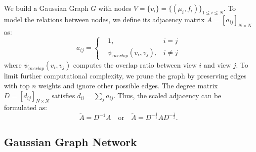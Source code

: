We build a Gaussian Graph $G$ with nodes $V=\{v_{i}\}=\{(\mu_{i},f_{i})\}_{1\leq i\leq N}$. 
To model the relations between nodes, we define its adjacency matrix $A=[a_{ij}]_{N\times N}$ as:
\begin{equation}
    a_{ij} = 
    \left\{
    \begin{aligned}
       & 1, & i=j \\
       & \psi_{overlap}(v_{i}, v_{j}) , & i\neq j
    \end{aligned}
    \right.
    \label{eq:adjacency matrix}
\end{equation}
where $\psi_{overlap}(v_{i}, v_{j})$ computes the overlap ratio between view $i$ and view $j$.
To limit further computational complexity, we prune the graph by preserving edges with top $n$ weights and ignore other possible edges. 
The degree matrix $D=[d_{ij}]_{N\times N}$ satisfies $d_{ii}=\sum_{j}a_{ij}$. Thus, the scaled adjacency can be formulated as:
\begin{equation}
    \tilde{A}=D^{-1}A \quad \textrm{or} \quad \tilde{A}=D^{-\frac{1}{2}}AD^{-\frac{1}{2}}.
\end{equation}

\subsection{Gaussian Graph Network}

